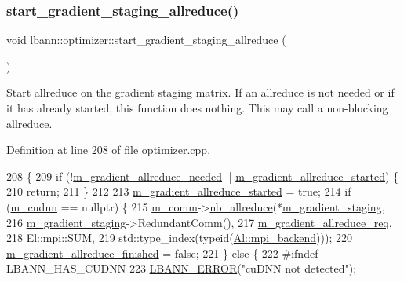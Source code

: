 \subsubsection{\texorpdfstring{start\+\_\+gradient\+\_\+staging\+\_\+allreduce()}{start\_gradient\_staging\_allreduce()}}
{\footnotesize\ttfamily void lbann\+::optimizer\+::start\+\_\+gradient\+\_\+staging\+\_\+allreduce (\begin{DoxyParamCaption}{ }\end{DoxyParamCaption})}

Start allreduce on the gradient staging matrix. If an allreduce is not needed or if it has already started, this function does nothing. This may call a non-\/blocking allreduce. 

Definition at line 208 of file optimizer.\+cpp.


\begin{DoxyCode}
208                                                  \{
209   \textcolor{keywordflow}{if} (!\hyperlink{classlbann_1_1optimizer_a2dc18dcc3cf9510947304c3c5d059eb0}{m\_gradient\_allreduce\_needed} || 
      \hyperlink{classlbann_1_1optimizer_ac77740a916f397600efae0c03bc5a045}{m\_gradient\_allreduce\_started}) \{
210     \textcolor{keywordflow}{return};
211   \}
212 
213   \hyperlink{classlbann_1_1optimizer_ac77740a916f397600efae0c03bc5a045}{m\_gradient\_allreduce\_started} = \textcolor{keyword}{true};
214   \textcolor{keywordflow}{if} (\hyperlink{classlbann_1_1optimizer_a2f24dbeaca18b06f4aa7d179bbf96680}{m\_cudnn} == \textcolor{keyword}{nullptr}) \{
215     \hyperlink{classlbann_1_1optimizer_a8c2569a8fcf0ee969517067b81896c44}{m\_comm}->\hyperlink{classlbann_1_1lbann__comm_a2a7bb6cf3707366fc0671d8894ca30ea}{nb\_allreduce}(*\hyperlink{classlbann_1_1optimizer_a92cd058d4f9fc8162d36d52461a96df2}{m\_gradient\_staging},
216                          \hyperlink{classlbann_1_1optimizer_a92cd058d4f9fc8162d36d52461a96df2}{m\_gradient\_staging}->RedundantComm(),
217                          \hyperlink{classlbann_1_1optimizer_a851681b39c34a3439a9838c07e84b87c}{m\_gradient\_allreduce\_req},
218                          El::mpi::SUM,
219                          std::type\_index(\textcolor{keyword}{typeid}(\hyperlink{namespacelbann_1_1Al_a8a69c2fac7e1117883fff1903c2232ce}{Al::mpi\_backend})));
220     \hyperlink{classlbann_1_1optimizer_a4d332551d05e245ad3f862653b5af65a}{m\_gradient\_allreduce\_finished} = \textcolor{keyword}{false};
221   \} \textcolor{keywordflow}{else} \{
222 \textcolor{preprocessor}{    #ifndef LBANN\_HAS\_CUDNN}
223     \hyperlink{base_8hpp_a80b1d707117e968a6951b7222e4b2b87}{LBANN\_ERROR}(\textcolor{stringliteral}{"cuDNN not detected"});

\end{DoxyCode}
